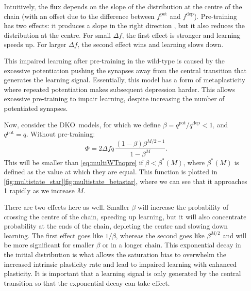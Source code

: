 \documentclass[10pt]{article}
\newcommand{\pot}{^{\text{pot}}}
\newcommand{\dep}{^{\text{dep}}}
\newcommand{\KO}{DKO}
\begin{document}
Intuitively, the flux depends on the slope of the distribution at the centre of the chain (with an offset due to the difference between $f\pot$ and $f\dep$).
Pre-training has two effects: it produces a slope in the right direction
, but it also reduces the distribution at the centre.
For small $\Delta f$, the first effect is stronger and learning speeds up.
For larger $\Delta f$, the second effect wins and learning slows down.

This impaired learning after pre-training in the wild-type is caused by the excessive potentiation pushing the synapses away from the central transition that generates the learning signal.
Essentially, this model has a form of metaplasticity where repeated potentiation makes subsequent depression harder.
This allows excessive pre-training to impair learning, despite increasing the number of potentiated synapses.


Now, consider the \KO\ models, for which we define $\beta=q\pot/q\dep<1$, and $q\pot=q$.
Without pre-training:
%
\begin{equation}\label{eq:multiKOnopre}
  \Phi = 2{\Delta f} q\,\frac{(1-\beta)\beta^{M/2-1}}{1-\beta^M}.
\end{equation}
%
This will be smaller than \eqref{eq:multiWTnopre} if $\beta<\beta^*(M)$, where $\beta^*(M)$ is defined as the value at which they are equal.
This function is plotted in \autoref{fig:multistate_star}\ref{fig:multistate_betastar}, where we can see that it approaches 1 rapidly as we increase $M$.

There are two effects here as well.
Smaller $\beta$ will increase the probability of crossing the centre of the chain, speeding up learning, but it will also concentrate probability at the ends of the chain, depleting the centre and slowing down learning.
The first effect goes like $1/\beta$, whereas the second goes like $\beta^{M/2}$ and will be more significant for smaller $\beta$ or in a longer chain.
This exponential decay in the initial distribution is what allows the saturation bias to overwhelm the increased intrinsic plasticity rate and lead to impaired learning with enhanced plasticity.
It is important that a learning signal is only generated by the central transition so that the exponential decay can take effect.
\end{document}
